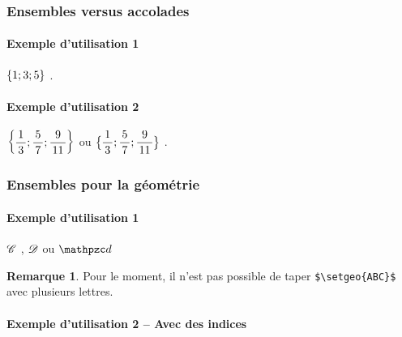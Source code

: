 \documentclass[12pt,a4paper]{article}
\theoremstyle{definition}
\newtheorem*{remark}{Remarque}
\begin{document}
\subsubsection{Ensembles versus accolades}

\paragraph{Exemple d'utilisation 1}

\begin{latexex}
$\setgene{1 ; 3 ; 5}$ .
\end{latexex}




\paragraph{Exemple d'utilisation 2}

\begin{latexex}
$\displaystyle
 \setgene{\frac{1}{3} ; \frac{5}{7} ; 
          \frac{9}{11}}$
ou
$\displaystyle
 \setgene*{\frac{1}{3} ; \frac{5}{7} ;
           \frac{9}{11}}$ .
\end{latexex}




\subsubsection{Ensembles pour la géométrie} \label{set-geo}

\paragraph{Exemple d'utilisation 1}

\begin{latexex}
$\setgeo{C}$ ,
$\setgeo{D}$ ou
$\setgeo{d}$
\end{latexex}

\begin{remark}
	Pour le moment, il n'est pas possible de taper \verb+$\setgeo{ABC}$+ avec plusieurs lettres.
\end{remark}




\paragraph{Exemple d'utilisation 2 -- Avec des indices}
\end{document}
